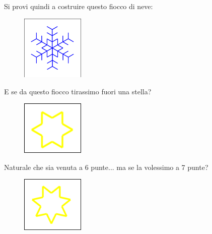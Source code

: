 \vskip 1cm


\begin{minipage}{0.40\textwidth}
Si provi quindi a costruire questo fiocco di neve:
\end{minipage}
\begin{minipage}{0.4\textwidth}
\begin{figure}[H]
   \includegraphics[width=3.0cm,trim=4 4 8 4,clip]{./images/ripetere/ripetere-9.png}
   \label{rip-9}
\end{figure}
\end{minipage} \hfill


\vskip 1cm

\begin{minipage}{0.40\textwidth}
E se da questo fiocco tirassimo fuori una stella? 
\end{minipage}
\begin{minipage}{0.4\textwidth}
\begin{figure}[H]
   \includegraphics[width=3.0cm,trim=4 4 8 4,clip]{./images/ripetere/ripetere-10.png}
   \label{rip-10}
\end{figure}
\end{minipage} \hfill

\vskip 1cm

\begin{minipage}{0.40\textwidth}
Naturale che sia venuta a 6 punte... ma se la volessimo a 7 punte? 
\end{minipage}
\begin{minipage}{0.4\textwidth}
\begin{figure}[H]
   \includegraphics[width=3.0cm,trim=4 4 8 4,clip]{./images/ripetere/ripetere-11.png}
   \label{rip-11}
\end{figure}
\end{minipage} \hfill

